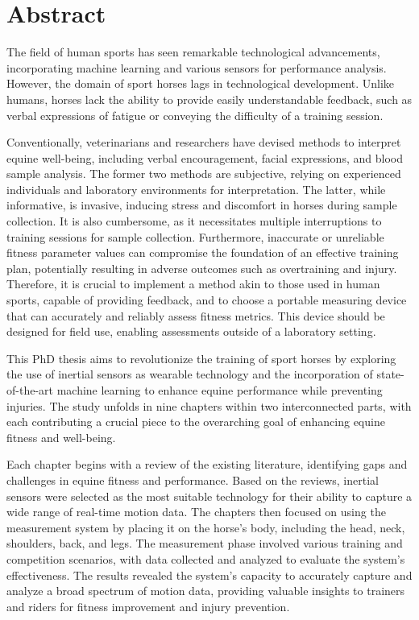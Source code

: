 \chapter*{Abstract}

The field of human sports has seen remarkable technological advancements, incorporating machine learning and various sensors for performance analysis. However, the domain of sport horses lags in technological development. Unlike humans, horses lack the ability to provide easily understandable feedback, such as verbal expressions of fatigue or conveying the difficulty of a training session. 

Conventionally, veterinarians and researchers have devised methods to interpret equine well-being, including verbal encouragement, facial expressions, and blood sample analysis. The former two methods are subjective, relying on experienced individuals and laboratory environments for interpretation. The latter, while informative, is invasive, inducing stress and discomfort in horses during sample collection. It is also cumbersome, as it necessitates multiple interruptions to training sessions for sample collection. Furthermore, inaccurate or unreliable fitness parameter values can compromise the foundation of an effective training plan, potentially resulting in adverse outcomes such as overtraining and injury. Therefore, it is crucial to implement a method akin to those used in human sports, capable of providing feedback, and to choose a portable measuring device that can accurately and reliably assess fitness metrics. This device should be designed for field use, enabling assessments outside of a laboratory setting.

This PhD thesis aims to revolutionize the training of sport horses by exploring the use of inertial sensors as wearable technology and the incorporation of state-of-the-art machine learning to enhance equine performance while preventing injuries. The study unfolds in nine chapters within two interconnected parts, with each contributing a crucial piece to the overarching goal of enhancing equine fitness and well-being.

Each chapter begins with a review of the existing literature, identifying gaps and challenges in equine fitness and performance. Based on the reviews, inertial sensors were selected as the most suitable technology for their ability to capture a wide range of real-time motion data. The chapters then focused on using the measurement system by placing it on the horse's body, including the head, neck, shoulders, back, and legs. The measurement phase involved various training and competition scenarios, with data collected and analyzed to evaluate the system's effectiveness. The results revealed the system's capacity to accurately capture and analyze a broad spectrum of motion data, providing valuable insights to trainers and riders for fitness improvement and injury prevention.


